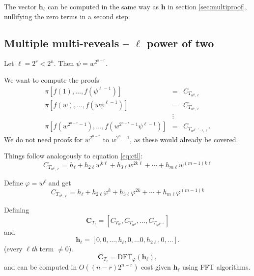 \documentclass[a4paper]{article}
\begin{document}
The vector $\mathbf{h_\ell}$ can be computed in the same way as $\mathbf{h}$ in section \ref{sec:multiproof}, nullifying the zero terms in a second step.

\subsection{Multiple multi-reveals -- $\ell$ power of two}

Let $\ell=2^r<2^n$. Then $\psi=w^{2^{n-r}}$.

We want to compute the proofs
\begin{eqnarray}
     \pi[f(1), \ldots, f(\psi^{\ell-1})] &=& C_{T_{w^0, \ell}} \\
     \pi[f(w), \ldots, f(w\psi^{\ell-1})] &=& C_{T_{w^1, \ell}} \\
     &\vdots& \nonumber \\
     \pi[f(w^{2^{n-r}-1}), \ldots, f(w^{2^{n-r}-1}\psi^{\ell-1})] &=& C_{T_{w^{2^{n-r}-1}, \ell}} \text{.}
\end{eqnarray}
We do not need proofs for $w^{2^{n-r}}$ to $w^{2^{n}-1}$, as these would already be covered.

Things follow analogously to equation \eqref{eq:ctl}:
\begin{equation}
     C_{T_{w^k,\ell}} = h_\ell + h_{2\ell}w^{k\ell} + h_{3\ell}w^{2k\ell}+\cdots + h_{m\ell}w^{(m-1)k\ell}
\end{equation}

Define $\varphi=w^\ell$ and get
\begin{equation}\label{eq:ctle}
     C_{T_{w^k,\ell}} = h_\ell + h_{2\ell}\varphi^{k} + h_{3\ell}\varphi^{2k}+\cdots + h_{m\ell}\varphi^{(m-1)k}
\end{equation}

Defining
$$
\mathbf{C}_{T_\ell} = [C_{T_{w}},C_{T_{w^{2}}},\ldots,C_{T_{w^{2^{n-r}}}}]
$$
and
$$
\mathbf{h_\ell} = [0,0,\ldots,h_\ell,0,\ldots 0,h_{2\ell},0,\ldots].
$$
(every $\ell${\em th} term $\neq0$). 
\begin{equation}
 \mathbf{C}_{T_\ell} = \mathrm{DFT}_\varphi(\mathbf{h_\ell}), 
\end{equation}
and can be computed in $O((n-r)2^{n-r})$ cost given $\mathbf{h_\ell}$ using FFT algorithms.
\end{document}
